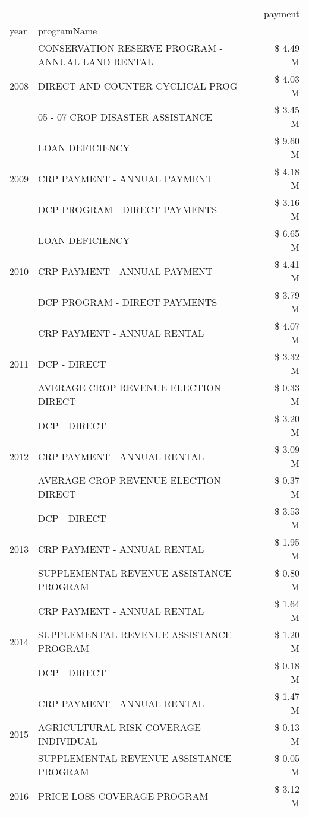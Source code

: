 \begin{tabular}{llr}
\toprule
 &  & payment \\
year & programName &  \\
\midrule
\multirow[t]{3}{*}{2008} & CONSERVATION RESERVE PROGRAM - ANNUAL LAND RENTAL & \$ 4.49 M \\
 & DIRECT AND COUNTER CYCLICAL PROG & \$ 4.03 M \\
 & 05 - 07 CROP DISASTER ASSISTANCE & \$ 3.45 M \\
\cline{1-3}
\multirow[t]{3}{*}{2009} & LOAN DEFICIENCY & \$ 9.60 M \\
 & CRP PAYMENT - ANNUAL PAYMENT & \$ 4.18 M \\
 & DCP PROGRAM - DIRECT PAYMENTS & \$ 3.16 M \\
\cline{1-3}
\multirow[t]{3}{*}{2010} & LOAN DEFICIENCY & \$ 6.65 M \\
 & CRP PAYMENT - ANNUAL PAYMENT & \$ 4.41 M \\
 & DCP PROGRAM - DIRECT PAYMENTS & \$ 3.79 M \\
\cline{1-3}
\multirow[t]{3}{*}{2011} & CRP PAYMENT - ANNUAL RENTAL & \$ 4.07 M \\
 & DCP - DIRECT & \$ 3.32 M \\
 & AVERAGE CROP REVENUE ELECTION-DIRECT & \$ 0.33 M \\
\cline{1-3}
\multirow[t]{3}{*}{2012} & DCP - DIRECT & \$ 3.20 M \\
 & CRP PAYMENT - ANNUAL RENTAL & \$ 3.09 M \\
 & AVERAGE CROP REVENUE ELECTION-DIRECT & \$ 0.37 M \\
\cline{1-3}
\multirow[t]{3}{*}{2013} & DCP - DIRECT & \$ 3.53 M \\
 & CRP PAYMENT - ANNUAL RENTAL & \$ 1.95 M \\
 & SUPPLEMENTAL REVENUE ASSISTANCE PROGRAM & \$ 0.80 M \\
\cline{1-3}
\multirow[t]{3}{*}{2014} & CRP PAYMENT - ANNUAL RENTAL & \$ 1.64 M \\
 & SUPPLEMENTAL REVENUE ASSISTANCE PROGRAM & \$ 1.20 M \\
 & DCP - DIRECT & \$ 0.18 M \\
\cline{1-3}
\multirow[t]{3}{*}{2015} & CRP PAYMENT - ANNUAL RENTAL & \$ 1.47 M \\
 & AGRICULTURAL RISK COVERAGE - INDIVIDUAL & \$ 0.13 M \\
 & SUPPLEMENTAL REVENUE ASSISTANCE PROGRAM & \$ 0.05 M \\
\cline{1-3}
\multirow[t]{3}{*}{2016} & PRICE LOSS COVERAGE PROGRAM & \$ 3.12 M \\

\end{tabular}
